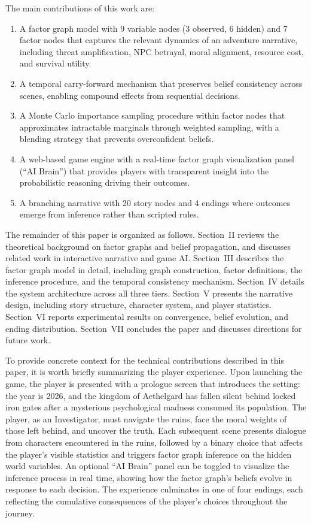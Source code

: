 \documentclass[journal]{IEEEtran}
\begin{document}
The main contributions of this work are:
\begin{enumerate}
\item A factor graph model with 9 variable nodes (3 observed, 6 hidden) and 7 factor nodes that captures the relevant dynamics of an adventure narrative, including threat amplification, NPC betrayal, moral alignment, resource cost, and survival utility.
\item A temporal carry-forward mechanism that preserves belief consistency across scenes, enabling compound effects from sequential decisions.
\item A Monte Carlo importance sampling procedure within factor nodes that approximates intractable marginals through weighted sampling, with a blending strategy that prevents overconfident beliefs.
\item A web-based game engine with a real-time factor graph visualization panel (``AI Brain'') that provides players with transparent insight into the probabilistic reasoning driving their outcomes.
\item A branching narrative with 20 story nodes and 4 endings where outcomes emerge from inference rather than scripted rules.
\end{enumerate}

The remainder of this paper is organized as follows. Section~II reviews the theoretical background on factor graphs and belief propagation, and discusses related work in interactive narrative and game AI. Section~III describes the factor graph model in detail, including graph construction, factor definitions, the inference procedure, and the temporal consistency mechanism. Section~IV details the system architecture across all three tiers. Section~V presents the narrative design, including story structure, character system, and player statistics. Section~VI reports experimental results on convergence, belief evolution, and ending distribution. Section~VII concludes the paper and discusses directions for future work.

To provide concrete context for the technical contributions described in this paper, it is worth briefly summarizing the player experience. Upon launching the game, the player is presented with a prologue screen that introduces the setting: the year is 2026, and the kingdom of Aethelgard has fallen silent behind locked iron gates after a mysterious psychological madness consumed its population. The player, as an Investigator, must navigate the ruins, face the moral weights of those left behind, and uncover the truth. Each subsequent scene presents dialogue from characters encountered in the ruins, followed by a binary choice that affects the player's visible statistics and triggers factor graph inference on the hidden world variables. An optional ``AI Brain'' panel can be toggled to visualize the inference process in real time, showing how the factor graph's beliefs evolve in response to each decision. The experience culminates in one of four endings, each reflecting the cumulative consequences of the player's choices throughout the journey.
\end{document}
